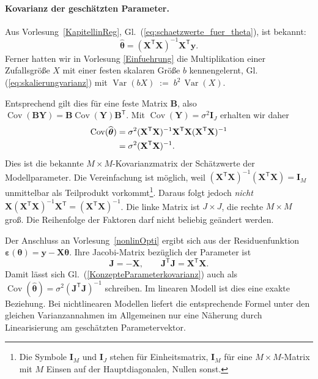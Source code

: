 \paragraph{Kovarianz der geschätzten Parameter.}
Aus Vorlesung~\ref{KapitellinReg}, Gl.~(\ref{eq:schaetzwerte_fuer_theta}), ist bekannt:
\begin{equation}
\widehat{\boldsymbol\theta}
=(\mathbf X^\mathsf T\mathbf X)^{-1}\mathbf X^\mathsf T\mathbf y.
\end{equation}
Ferner hatten wir in Vorlesung \ref{Einfuehrung} die Multiplikation einer Zufallsgröße $X$ mit einer festen skalaren Größe $b$ kennengelernt, Gl. (\ref{eq:skalierungvarianz}) mit $\operatorname {Var}(b X) \; := \; b^2 \, \operatorname {Var}(X)$. 

Entsprechend gilt dies für eine feste Matrix $\mathbf B$, also
$\operatorname{Cov}(\mathbf B\mathbf Y)
=\mathbf B\operatorname{Cov}(\mathbf Y)\mathbf B^\mathsf T$.
Mit $\operatorname{Cov}(\mathbf Y)=\sigma^2\mathbf I_J$ erhalten wir daher
\begin{align}
\operatorname{Cov}(\widehat{\boldsymbol\theta})
&=\sigma^2(\mathbf X^\mathsf T\mathbf X)^{-1}
\mathbf X^\mathsf T\mathbf X
(\mathbf X^\mathsf T\mathbf X)^{-1}\notag\\
&=\sigma^2(\mathbf X^\mathsf T\mathbf X)^{-1}.
\label{KonzepteParameterkovarianz}
\end{align}
Dies ist die bekannte $M\times M$-Kovarianzmatrix der Schätzwerte der Modellparameter.
Die Vereinfachung ist möglich, weil
$(\mathbf X^\mathsf T\mathbf X)^{-1}(\mathbf X^\mathsf T\mathbf X)
=\mathbf I_M$ unmittelbar als Teilprodukt vorkommt\footnote{Die Symbole $\mathbf I_M$ und $\mathbf I_J$ stehen für Einheitsmatrix, $\mathbf I_M$ für eine $M \times M$-Matrix mit $M$ Einsen auf der Hauptdiagonalen, Nullen sonst.}.
Daraus folgt jedoch \emph{nicht}
$\mathbf X(\mathbf X^\mathsf T\mathbf X)^{-1}\mathbf X^\mathsf T
=(\mathbf X^\mathsf T\mathbf X)^{-1}$.
Die linke Matrix ist $J\times J$, die rechte $M\times M$ groß.
Die Reihenfolge der Faktoren darf nicht beliebig geändert werden.

Der Anschluss an Vorlesung~\ref{nonlinOpti} ergibt sich aus der Residuenfunktion
$\boldsymbol\varepsilon(\boldsymbol\theta)
=\mathbf y-\mathbf X\boldsymbol\theta$.
Ihre Jacobi-Matrix bezüglich der Parameter ist
\begin{equation}
\mathbf J=-\mathbf X,
\qquad
\mathbf J^\mathsf T\mathbf J=\mathbf X^\mathsf T\mathbf X.
\end{equation}
Damit lässt sich Gl.~(\ref{KonzepteParameterkovarianz}) auch als
$\operatorname{Cov}(\widehat{\boldsymbol\theta})
=\sigma^2(\mathbf J^\mathsf T\mathbf J)^{-1}$ schreiben.
Im linearen Modell ist dies eine exakte Beziehung. Bei nichtlinearen
Modellen liefert die entsprechende Formel unter den gleichen
Varianzannahmen im Allgemeinen nur eine Näherung durch Linearisierung
am geschätzten Parametervektor.


